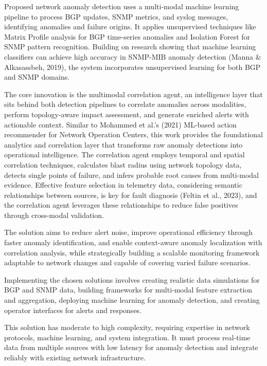 \documentclass[11pt]{article}
\begin{document}
Proposed network anomaly detection uses a multi-modal machine learning pipeline to process BGP updates, SNMP metrics, and syslog messages, identifying anomalies and failure origins. It applies unsupervised techniques like Matrix Profile analysis for BGP time-series anomalies and Isolation Forest for SNMP pattern recognition. Building on research showing that machine learning classifiers can achieve high accuracy in SNMP-MIB anomaly detection (Manna \& Alkasassbeh, 2019), the system incorporates unsupervised learning for both BGP and SNMP domains. 

The core innovation is the multimodal correlation agent, an intelligence layer that sits behind both detection pipelines to correlate anomalies across modalities, perform topology-aware impact assessment, and generate enriched alerts with actionable context. Similar to Mohammed et al.'s (2021) ML-based action recommender for Network Operation Centers, this work provides the foundational analytics and correlation layer that transforms raw anomaly detections into operational intelligence. The correlation agent employs temporal and spatial correlation techniques, calculates blast radius using network topology data, detects single points of failure, and infers probable root causes from multi-modal evidence. Effective feature selection in telemetry data, considering semantic relationships between sources, is key for fault diagnosis (Feltin et al., 2023), and the correlation agent leverages these relationships to reduce false positives through cross-modal validation.

The solution aims to reduce alert noise, improve operational efficiency through faster anomaly identification, and enable context-aware anomaly localization with correlation analysis, while strategically building a scalable monitoring framework adaptable to network changes and capable of covering varied failure scenarios.

Implementing the chosen solutions involves creating realistic data simulations for BGP and SNMP data, building frameworks for multi-modal feature extraction and aggregation, deploying machine learning for anomaly detection, and creating operator interfaces for alerts and responses.

This solution has moderate to high complexity, requiring expertise in network protocols, machine learning, and system integration. It must process real-time data from multiple sources with low latency for anomaly detection and integrate reliably with existing network infrastructure.
\end{document}
